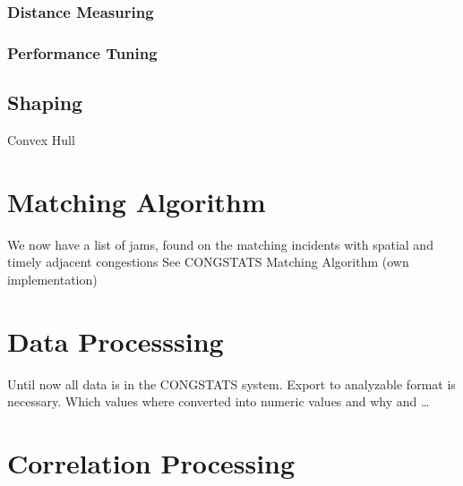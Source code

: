 \documentclass[a4paper,12pt]{report}
\begin{document}











\subsubsection{Distance Measuring}

\subsubsection{Performance Tuning}

\subsection{Shaping}

Convex Hull

\section{Matching Algorithm}
We now have a list of jams, found on the matching incidents with spatial and timely adjacent congestions
See CONGSTATS Matching Algorithm (own implementation)

\section{Data Processsing}
\label{methodology_data_generation}
Until now all data is in the CONGSTATS system. Export to analyzable format is necessary.
Which values where converted into numeric values and why and …

\section{Correlation Processing}
\label{definition_correlation_script}
\end{document}
